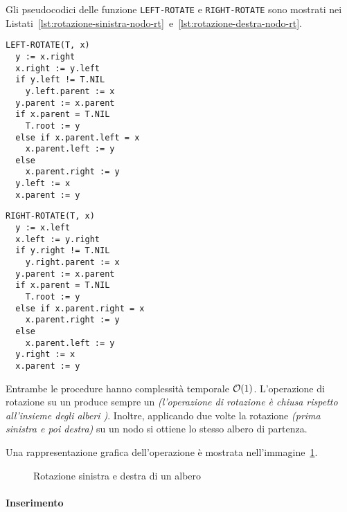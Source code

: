 \documentclass[italian, 10pt]{article}
\begin{document}
\bigskip
Gli pseudocodici delle funzione \texttt{LEFT-ROTATE} e \texttt{RIGHT-ROTATE} sono mostrati nei Listati~\ref{lst:rotazione-sinistra-nodo-rt}~e~\ref{lst:rotazione-destra-nodo-rt}.

\begin{minipage}[t]{0.495\linewidth}
  \begin{lstlisting}[style=pseudocode, caption={Rotazione sinistra di un nodo in un RB}, label={lst:rotazione-sinistra-nodo-rt}]
LEFT-ROTATE(T, x)
  y := x.right
  x.right := y.left
  if y.left != T.NIL
    y.left.parent := x
  y.parent := x.parent
  if x.parent = T.NIL
    T.root := y
  else if x.parent.left = x
    x.parent.left := y
  else
    x.parent.right := y
  y.left := x
  x.parent := y
  \end{lstlisting}
\end{minipage}
\begin{minipage}[t]{0.495\linewidth}
  \begin{lstlisting}[style=pseudocode, caption={Rotazione destra di un nodo in un RB}, label={lst:rotazione-destra-nodo-rt}]
RIGHT-ROTATE(T, x)
  y := x.left
  x.left := y.right
  if y.right != T.NIL
    y.right.parent := x
  y.parent := x.parent
  if x.parent = T.NIL
    T.root := y
  else if x.parent.right = x
    x.parent.right := y
  else
    x.parent.left := y
  y.right := x
  x.parent := y
  \end{lstlisting}
\end{minipage}

\bigskip
Entrambe le procedure hanno complessità temporale \(\mathcal{O}(1)\).
L'operazione di rotazione su un \RB produce sempre un \RB \textit{(l'operazione di rotazione è chiusa rispetto all'insieme degli alberi \RB)}.
Inoltre, applicando due volte la rotazione \textit{(prima sinistra e poi destra)} su un nodo si ottiene lo stesso albero di partenza.

\bigskip
Una rappresentazione grafica dell'operazione è mostrata nell'immagine~\ref{fig:rotazione-sinistra-destra-rb}.

\begin{figure}[htbp]
  \bigskip
  \centering
  \caption{Rotazione sinistra e destra di un albero \RB}
  \label{fig:rotazione-sinistra-destra-rb}
  \bigskip
\end{figure}

\paragraph{Inserimento}
\label{par:inserimento-rb}
\end{document}
